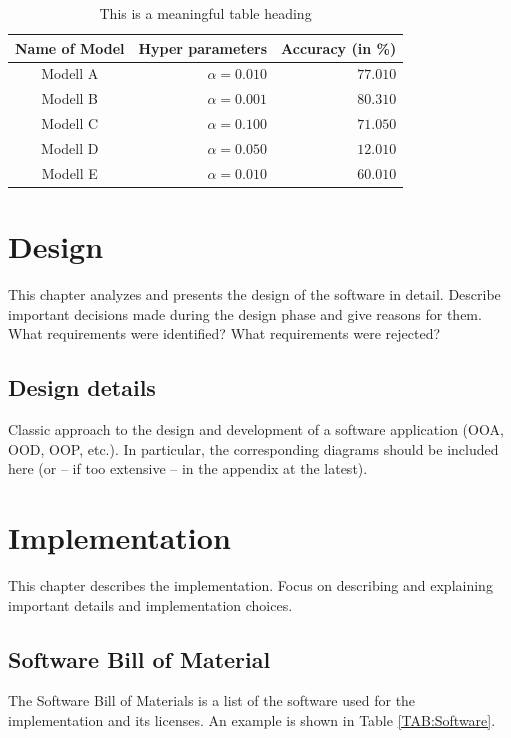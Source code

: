 \documentclass[12pt]{report}           %
\theoremstyle{thesis}        %
\begin{document}
	\begin{table}
		\centering
		\caption{This is a meaningful table heading}\label{Tab:BeispielTabelle}
		\begin{tabular}{|c|r|r|}
			\hline
			Name of Model&Hyper parameters&Accuracy (in \%)\\
			\hline\hline
			Modell A & $\alpha=0.010$&$77.010$\\
			Modell B & $\alpha=0.001$&$80.310$\\
			Modell C & $\alpha=0.100$&$71.050$\\
			Modell D & $\alpha=0.050$&$12.010$\\
			Modell E & $\alpha=0.010$&$60.010$\\
			\hline
		\end{tabular}
	\end{table}
	\chapter{Design}
	This chapter analyzes and presents the design of the software in detail. Describe important decisions made during the design phase and give reasons for them. What requirements were identified? What requirements were rejected? 
	\section{Design details}
	Classic approach to the design and development of a software application (OOA, OOD, OOP, etc.). In particular, the corresponding diagrams should be included here (or – if too extensive – in the appendix at the latest).

	\chapter{Implementation}
	\label{chap:implementierung}
This chapter describes the implementation. Focus on describing and explaining important details and implementation choices.
	\section{Software Bill of Material}
The Software Bill of Materials is a list of the software used for the implementation and its licenses. An example is shown in Table \ref{TAB:Software}.
	
\end{document}
